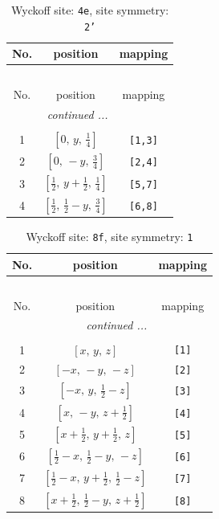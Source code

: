 \documentclass[fleqn,8pt]{jsarticle}
\begin{document}
\renewcommand{\arraystretch}{1.2}
\begin{longtable}{ccc}
\caption{Wyckoff site: {\tt 4e}, site symmetry: {\tt 2'}}
 \\
 \hline \hline
No. & position & mapping \\ \hline \endfirsthead

\multicolumn{2}{l}{\tablename\ \thetable{}} \\
 \hline \hline
No. & position & mapping \\ \hline \endhead

 \hline \hline
\multicolumn{2}{r}{\footnotesize\it continued ...} \\ \endfoot

 \hline \hline
\multicolumn{2}{r}{} \\ \endlastfoot

1 & $\left[ 0,\, y,\, \frac{1}{4} \right]$ & {\tt [1,3]} \\ \hline
2 & $\left[ 0,\, - y,\, \frac{3}{4} \right]$ & {\tt [2,4]} \\ \hline
3 & $\left[ \frac{1}{2},\, y + \frac{1}{2},\, \frac{1}{4} \right]$ & {\tt [5,7]} \\ \hline
4 & $\left[ \frac{1}{2},\, \frac{1}{2} - y,\, \frac{3}{4} \right]$ & {\tt [6,8]} \\
\end{longtable}
\renewcommand{\arraystretch}{1.2}
\begin{longtable}{ccc}
\caption{Wyckoff site: {\tt 8f}, site symmetry: {\tt 1}}
 \\
 \hline \hline
No. & position & mapping \\ \hline \endfirsthead

\multicolumn{2}{l}{\tablename\ \thetable{}} \\
 \hline \hline
No. & position & mapping \\ \hline \endhead

 \hline \hline
\multicolumn{2}{r}{\footnotesize\it continued ...} \\ \endfoot

 \hline \hline
\multicolumn{2}{r}{} \\ \endlastfoot

1 & $\left[ x,\, y,\, z \right]$ & {\tt [1]} \\ \hline
2 & $\left[ - x,\, - y,\, - z \right]$ & {\tt [2]} \\ \hline
3 & $\left[ - x,\, y,\, \frac{1}{2} - z \right]$ & {\tt [3]} \\ \hline
4 & $\left[ x,\, - y,\, z + \frac{1}{2} \right]$ & {\tt [4]} \\ \hline
5 & $\left[ x + \frac{1}{2},\, y + \frac{1}{2},\, z \right]$ & {\tt [5]} \\ \hline
6 & $\left[ \frac{1}{2} - x,\, \frac{1}{2} - y,\, - z \right]$ & {\tt [6]} \\ \hline
7 & $\left[ \frac{1}{2} - x,\, y + \frac{1}{2},\, \frac{1}{2} - z \right]$ & {\tt [7]} \\ \hline
8 & $\left[ x + \frac{1}{2},\, \frac{1}{2} - y,\, z + \frac{1}{2} \right]$ & {\tt [8]} \\
\end{longtable}
\end{document}
